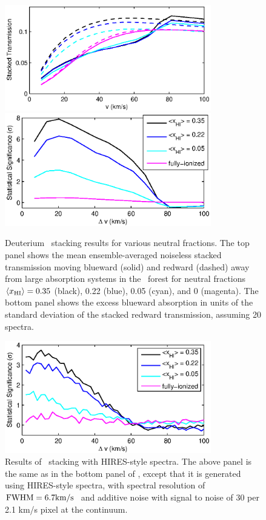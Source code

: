 \begin{figure}[t]
  \centering
  \includegraphics[width=9cm]{fig9a.eps}
  \includegraphics[width=9cm]{fig9b.eps}
  \caption{Deuterium \lyb\ stacking results for various neutral fractions. The top panel shows the mean ensemble-averaged noiseless stacked transmission moving blueward (solid) and redward (dashed) away from large absorption systems in the \lyb\ forest for neutral fractions $\langle x_{\text{HI}}\rangle = 0.35$ (black), 0.22 (blue), 0.05 (cyan), and 0 (magenta). The bottom panel shows the excess blueward absorption in units of the standard deviation of the stacked redward transmission, assuming 20 spectra. }
  \label{fig:LybResults}
\end{figure}

\begin{figure}[h]
  \centering
  \includegraphics[width=9cm]{fig10.eps}
  \caption{Results of \lyb\ stacking with HIRES-style spectra. The above panel is the same as in the bottom panel of , except that it is generated using HIRES-style spectra, with spectral resolution of $\text{FWHM}=6.7\text{km}/\text{s}\ $ and additive noise with signal to noise of 30 per 2.1 km/s pixel at the continuum. }
  \label{fig:LybResults_Noisy}
\end{figure}




